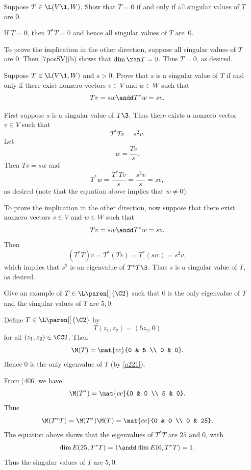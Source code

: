 
\exercise
Suppose $T \in \L(V\1, W)$. Show that $T = 0$ if and only if all singular values of $T$ are $0$.

\begin{Solution}
If $T = 0$, then $T^*T=0$ and hence all singular values of $T$ are~$0$.

To prove the implication in the other direction, suppose all singular values of $T$ are $0$. Then \ref{7posSV}(b) shows that
$\dim \ran T = 0$. Thus $T = 0$, as desired.
\end{Solution}

\exercise
Suppose $T \in \L(V\1, W)$ and $s > 0$. Prove that $s$ is a singular value of $T$ if and only if there exist nonzero vectors $v \in V$ and
$w \in W$ such that \label{2Schmidt}
\[
Tv = sw \andd T^* w = sv.
\]
\exercisedisplayend
{}

\begin{Solution}
First suppose $s$ is a singular value of $T\3$. Thus there exists a nonzero vector $v \in V$ such that
\[
T^*T v = s^2 v.
\]
Let
\[
w = \frac{Tv}{s}.
\]
Then $Tv = sw$ and
\[
T^*w = \frac{T^*Tv}{s} = \frac{s^2 v}{s} = sv,
\]
as desired (note that the equation above implies that $w \ne 0$).

To prove the implication in the other direction, now suppose that there exist nonzero vectors $v \in V$ and
$w \in W$ such that
\[
Tv = sw \andd T^* w = sv.
\]
Then
\[
(T^*T)v = T^*(Tv) = T^*(sw) = s^2 v,
\]
which implies that $s^2$ is an eigenvalue of $T^*T\3$. Thus $s$ is a singular value of $T$, as desired.
\end{Solution}

\exercise
Give an example of $T \in \L\paren[\big]{\C2}$ such that $0$ is the only eigenvalue of $T$ and the singular values of $T$ are $5, 0$.

\begin{Solution}
Define $T \in \L\paren[\big]{\C2}$ by
\[
T(z_1, z_2) = (5 z_2, 0)
\]
for all $(z_1, z_2) \in \CC2$. Then
\[
\M(T) = \mat{cc}
{0 & 5 \\
0 & 0}.
\]
Hence $0$ is the only eigenvalue of $T$ (by \ref{a221}).

From \ref{406} we have
\[
\M(T^*) =  \mat{cc}
{0 & 0 \\
5 & 0}.
\]
Thus
\[
\M(T^*T) = \M(T^*) \M(T) = \mat{cc}
{0 & 0 \\
0 & 25}.
\]
The equation above shows that the eigenvalues of $T^*T$ are $25$ and $0$, with
\[
\dim E(25, T^*T) = 1 \andd \dim E(0, T^*T) = 1.
\]
Thus the singular values of $T$ are $5, 0$.
\end{Solution}

